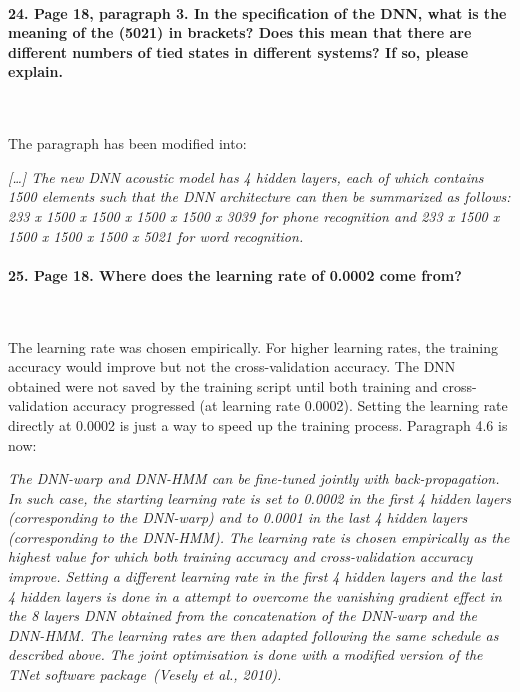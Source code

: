 \documentclass[]{article}
\begin{document}
\paragraph{24. Page 18, paragraph 3. In the specification of the DNN, what is the meaning of the (5021) in brackets? Does this mean that there are different numbers of tied states in different systems? If so, please explain.}

~

The paragraph has been modified into:

\textit{[\dots] The new DNN acoustic model  has 4 hidden layers,
each of  which contains 1500  elements such that the  DNN architecture
can then be summarized  as follows: 233 x 1500 x 1500  x 1500 x 1500 x
3039 for phone recognition and 233 x 1500 x 1500  x 1500 x 1500 x 5021 for word recognition.}

\paragraph{25. Page 18. Where does the learning rate of 0.0002 come from?}

~

The learning rate was chosen empirically. For higher learning rates, the training accuracy would improve but not the cross-validation accuracy. The DNN obtained were not saved by the training script until both training and cross-validation accuracy progressed (at learning rate 0.0002). Setting the learning rate directly at 0.0002 is just a way to speed up the training process. Paragraph 4.6 is now:

\textit{The DNN-warp and DNN-HMM can be fine-tuned jointly with back-propagation. In such case, the starting learning rate is set to 0.0002 in the first 4 hidden layers (corresponding to the DNN-warp) and to 0.0001 in the last 4 hidden layers (corresponding to the DNN-HMM). The learning rate is chosen empirically as the highest value for which both training accuracy and cross-validation accuracy improve. Setting a different learning rate in the first 4 hidden layers and the last 4 hidden layers is done in a attempt to overcome the vanishing gradient effect in the 8 layers DNN obtained from the concatenation of the DNN-warp and the DNN-HMM. The learning rates are then adapted following the same schedule as described above. The joint optimisation is done with a modified version of the TNet software package~(Vesely et al., 2010).}
\end{document}
